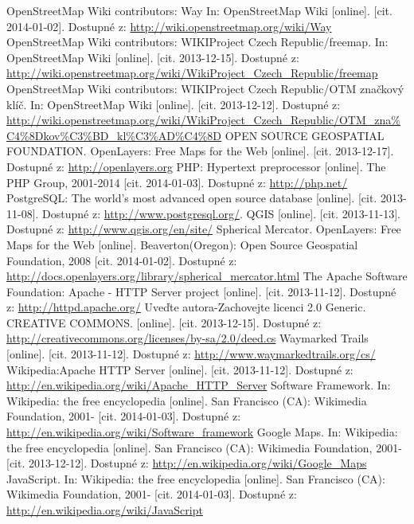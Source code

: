 \documentclass[11pt,a4paper,titlepage,oneside]{book}
\begin{document}
\begin{thebibliography}{99}
	OpenStreetMap Wiki contributors: Way In: OpenStreetMap Wiki [online]. [cit. 2014-01-02]. Dostupné z: \url{http://wiki.openstreetmap.org/wiki/Way}
	OpenStreetMap Wiki contributors: WIKIProject Czech Republic/freemap. In: OpenStreetMap Wiki [online]. [cit. 2013-12-15]. Dostupné z:  \url{http://wiki.openstreetmap.org/wiki/WikiProject_Czech_Republic/freemap}
	 OpenStreetMap Wiki contributors: WIKIProject Czech Republic/OTM značkový klíč. In: OpenStreetMap Wiki [online]. [cit. 2013-12-12]. Dostupné z: 	\url{http://wiki.openstreetmap.org/wiki/WikiProject_Czech_Republic/OTM_zna%C4%8Dkov%C3%BD_kl%C3%AD%C4%8D}
	OPEN SOURCE GEOSPATIAL FOUNDATION. OpenLayers: Free Maps for the Web [online]. [cit. 2013-12-17]. Dostupné z: \url{http://openlayers.org} 
	PHP: Hypertext preprocessor [online]. The PHP Group, 2001-2014 [cit. 2014-01-03]. Dostupné z: \url{http://php.net/}
	 PostgreSQL: The world's most advanced open source database [online]. [cit. 2013-11-08]. Dostupné z: \url{http://www.postgresql.org/}.
	QGIS [online]. [cit. 2013-11-13]. Dostupné z: \url{http://www.qgis.org/en/site/}
	Spherical Mercator. OpenLayers: Free Maps for the Web [online]. Beaverton(Oregon): Open Source Geospatial Foundation, 2008 [cit. 2014-01-02]. Dostupné z: \url{http://docs.openlayers.org/library/spherical_mercator.html}
	The Apache Software Foundation: Apache - HTTP Server project [online]. [cit. 2013-11-12]. Dostupné z: \url{http://httpd.apache.org/}
	Uveďte autora-Zachovejte licenci 2.0 Generic. CREATIVE COMMONS. [online]. [cit. 2013-12-15]. Dostupné z: \url{http://creativecommons.org/licenses/by-sa/2.0/deed.cs}
	 Waymarked Trails [online].  [cit. 2013-11-12]. Dostupné z: \url{http://www.waymarkedtrails.org/cs/}
	Wikipedia:Apache HTTP Server [online]. [cit. 2013-11-12]. Dostupné z: \url{http://en.wikipedia.org/wiki/Apache_HTTP_Server}	
       Software Framework. In: Wikipedia: the free encyclopedia [online]. San Francisco (CA): Wikimedia Foundation, 2001- [cit. 2014-01-03]. Dostupné z: \url{http://en.wikipedia.org/wiki/Software_framework}	
	Google Maps. In: Wikipedia: the free encyclopedia [online]. San Francisco (CA): Wikimedia Foundation, 2001- [cit. 2013-12-12]. Dostupné z: \url{http://en.wikipedia.org/wiki/Google_Maps}
       	JavaScript. In: Wikipedia: the free encyclopedia [online]. San Francisco (CA): Wikimedia Foundation, 2001- [cit. 2014-01-03]. Dostupné z: \url{http://en.wikipedia.org/wiki/JavaScript}

\end{thebibliography}
\end{document}
